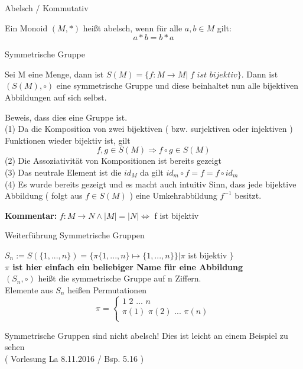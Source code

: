 \documentclass[smallheadings,12pt,a4paper]{scrartcl}
\begin{document}
\begin{center}
\item[Abelsch / Kommutativ]
\end{center}
\item Ein Monoid $(M, *)$ heißt abelsch, wenn für alle $ a,b \in M $ gilt: $$ a * b = b * a $$
\begin{center}

\item[Symmetrische Gruppe]
\end{center}
\item Sei M eine Menge, dann ist $ S(M) = \{ f: M \rightarrow M | \; \textit{f ist bijektiv} \} $. Dann ist $(S(M), \circ )$ eine symmetrische Gruppe und diese beinhaltet nun alle bijektiven Abbildungen auf sich selbst.
\item Beweis, dass dies eine Gruppe ist. \\
(1) Da die Komposition von zwei bijektiven ( bzw. surjektiven oder injektiven ) Funktionen wieder bijektiv ist, gilt \\
$$ f,g \in S(M) \Rightarrow f \circ g \in S(M) $$
(2) Die Assoziativität von Kompositionen ist bereits gezeigt \\
(3) Das neutrale Element ist die $ id_M $ da gilt $ id_m \circ f = f = f \circ id_m $ \\
(4) Es wurde bereits gezeigt und es macht auch intuitiv Sinn, dass jede bijektive Abbildung ( folgt aus $f\in S(M)$ ) eine Umkehrabbildung $ f^{-1}$ besitzt. \\
\item \textbf{Kommentar:} $ f: M \rightarrow N  \wedge |M|=|N| \Leftrightarrow $ f ist bijektiv
 
\begin{center}
\item[Weiterführung Symmetrische Gruppen]
\end{center}
\item $S_n:= S(\{1,...,n\})= \{\pi \{1,...,n\} \mapsto \{1,...,n\} \} | \pi $  ist bijektiv $ \} $ \\
\textbf{$\pi$ ist hier einfach ein beliebiger Name für eine Abbildung }\\
$(S_n, \circ ) $ heißt die symmetrische Gruppe auf n Ziffern. \\
Elemente aus $S_n$ heißen Permutationen
$$ \pi = \begin{cases} 
1 \, \, 2 \, \, ... \, \, n  \\
\pi (1) \, \, \pi (2) \, \, ... \, \, \pi (n)  \\
\end{cases} $$
\item Symmetrische Gruppen sind nicht abelsch! Dies ist leicht an einem Beispiel zu sehen \\
( Vorlesung La 8.11.2016 / Bsp. 5.16 )
\end{document}
